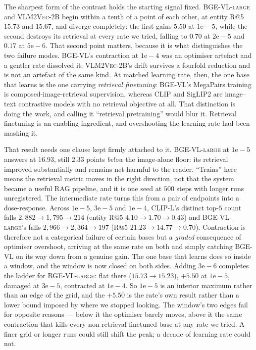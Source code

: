 The sharpest form of the contrast holds the starting signal fixed. \textsc{BGE-VL-large} and
\textsc{VLM2Vec-2B} begin within a tenth of a point of each other, at entity R@5 $15.73$ and
$15.67$, and diverge completely: the first gains $5.50$ at $1\mathrm{e}{-}5$, while the second
destroys its retrieval at every rate we tried, falling to $0.70$ at $2\mathrm{e}{-}5$ and $0.17$
at $5\mathrm{e}{-}6$. That second point matters, because it is what distinguishes the two failure
modes. \textsc{BGE-VL}'s contraction at $1\mathrm{e}{-}4$ was an optimiser artefact and a gentler
rate dissolved it; \textsc{VLM2Vec-2B}'s drift survives a fourfold reduction and is not an
artefact of the same kind. At matched learning rate, then, the one base that
learns is the one carrying \emph{retrieval finetuning}: \textsc{BGE-VL}'s MegaPairs training is
composed-image-retrieval supervision, whereas CLIP and SigLIP2 are image--text contrastive models
with no retrieval objective at all. That distinction is doing the work, and calling it
``retrieval pretraining'' would blur it. Retrieval finetuning is an enabling ingredient, and
overshooting the learning rate had been masking it.

That result needs one clause kept firmly attached to it. \textsc{BGE-VL-large} at
$1\mathrm{e}{-}5$ answers at $16.93$, still $2.33$ points \emph{below} the image-alone floor: its
retrieval improved substantially and remains net-harmful to the reader. ``Trains'' here means the
retrieval metric moves in the right direction, not that the system became a useful RAG pipeline,
and it is one seed at $500$ steps with longer runs unregistered. The intermediate rate turns this from a pair of endpoints into a
dose-response. Across $1\mathrm{e}{-}5$, $3\mathrm{e}{-}5$ and $1\mathrm{e}{-}4$,
\textsc{CLIP-L}'s distinct top-$5$ count falls $2{,}882 \to 1{,}795 \to 214$ (entity R@5
$4.10 \to 1.70 \to 0.43$) and \textsc{BGE-VL-large}'s falls $2{,}966 \to 2{,}364 \to 197$
(R@5 $21.23 \to 14.77 \to 0.70$). Contraction is therefore not a categorical failure of certain
bases but a \emph{graded} consequence of optimiser overshoot, arriving at the same rate on both
and simply catching \textsc{BGE-VL} on its way down from a genuine gain. The one base that learns does so inside a window, and the window is
now closed on both sides. Adding $3\mathrm{e}{-}6$ completes the ladder for
\textsc{BGE-VL-large}: flat there ($15.73 \to 15.23$), $+5.50$ at $1\mathrm{e}{-}5$, damaged at
$3\mathrm{e}{-}5$, contracted at $1\mathrm{e}{-}4$. So $1\mathrm{e}{-}5$ is an interior maximum
rather than an edge of the grid, and the $+5.50$ is the rate's own result rather than a lower
bound imposed by where we stopped looking. The window's two edges fail for opposite reasons ---
below it the optimiser barely moves, above it the same contraction that kills every
non-retrieval-finetuned base at any rate we tried. A finer grid or longer runs could still shift
the peak; a decade of learning rate could not.

